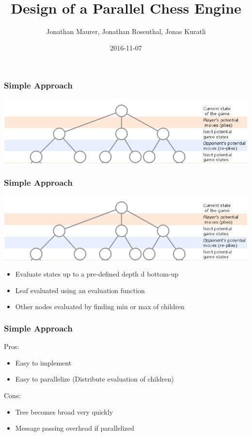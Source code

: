 \documentclass[aspectratio=43]{beamer}
\author{Jonathan Maurer, Jonathan Rosenthal, Jonas Kuratli}
\title{Design of a Parallel Chess Engine}
\date{2016-11-07}
\begin{document}
\titleframe




\begin{frame}
\frametitle{Simple Approach}

\includegraphics[width=\textwidth]{tree}



\end{frame}

\begin{frame}
\frametitle{Simple Approach}

\includegraphics[width=\textwidth]{tree}

\begin{itemize}
\item Evaluate states up to a pre-defined depth d bottom-up
\item Leaf evaluated using an evaluation function
\item Other nodes evaluated by finding min or max of children

\end{itemize}

\end{frame}

\begin{frame}
\frametitle{Simple Approach}

Pros:
\begin{itemize}
\item Easy to implement
\item Easy to parallelize (Distribute evaluation of children)
\end{itemize}

Cons:
\begin{itemize}
\item Tree becomes broad very quickly 
\item Message passing overhead if parallelized
\end{itemize}
\end{frame}
\end{document}
